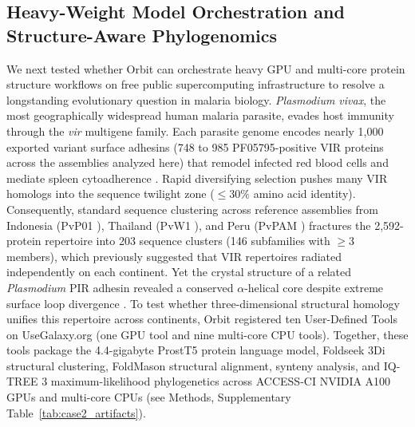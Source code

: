 \documentclass[11pt,letterpaper]{article}
\begin{document}
\subsection{Heavy-Weight Model Orchestration and Structure-Aware Phylogenomics}

We next tested whether Orbit can orchestrate heavy GPU and multi-core protein structure workflows on free public supercomputing infrastructure to resolve a longstanding evolutionary question in malaria biology. \textit{Plasmodium vivax}, the most geographically widespread human malaria parasite, evades host immunity through the \textit{vir} multigene family. Each parasite genome encodes nearly 1,000 exported variant surface adhesins (748 to 985 PF05795-positive VIR proteins across the assemblies analyzed here) that remodel infected red blood cells and mediate spleen cytoadherence \cite{carlton2008, lopez2013, auburn2016, minassian2021pvw1, demeulenaere2023, jackson2026}. Rapid diversifying selection pushes many VIR homologs into the sequence twilight zone ($\le 30\%$ amino acid identity). Consequently, standard sequence clustering across reference assemblies from Indonesia (PvP01 \cite{auburn2016}), Thailand (PvW1 \cite{minassian2021pvw1}), and Peru (PvPAM \cite{demeulenaere2023}) fractures the 2,592-protein repertoire into 203 sequence clusters (146 subfamilies with $\ge 3$ members), which previously suggested that VIR repertoires radiated independently on each continent. Yet the crystal structure of a related \textit{Plasmodium} PIR adhesin revealed a conserved $\alpha$-helical core despite extreme surface loop divergence \cite{harrison2020}. To test whether three-dimensional structural homology unifies this repertoire across continents, Orbit registered ten User-Defined Tools on UseGalaxy.org (one GPU tool and nine multi-core CPU tools). Together, these tools package the 4.4-gigabyte ProstT5 protein language model, Foldseek 3Di structural clustering, FoldMason structural alignment, synteny analysis, and IQ-TREE 3 maximum-likelihood phylogenetics across ACCESS-CI NVIDIA A100 GPUs and multi-core CPUs (see Methods, Supplementary Table~\ref{tab:case2_artifacts}).
\end{document}
